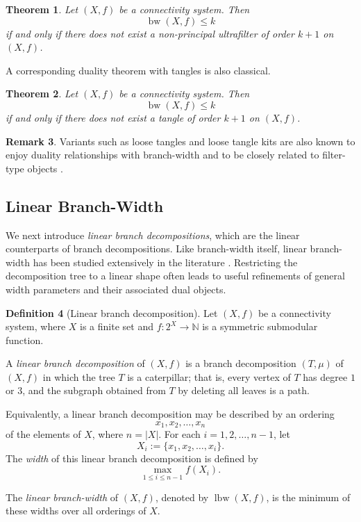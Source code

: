 \documentclass[10pt]{book}
\newtheorem{theorem}{Theorem}[section]
\theoremstyle{definition}
\newtheorem{remark}[theorem]{Remark}
\newtheorem{definition}[theorem]{Definition}
\begin{document}
\begin{theorem}\cite{16}
\label{thm:duality-ultrafilter}
Let \((X,f)\) be a connectivity system.
Then
\[
\operatorname{bw}(X,f)\leq k
\]
if and only if there does not exist a non-principal ultrafilter of order \(k+1\) on \((X,f)\).
\end{theorem}

A corresponding duality theorem with tangles is also classical.

\begin{theorem}\cite{9}
\label{thm:duality-tangle}
Let \((X,f)\) be a connectivity system.
Then
\[
\operatorname{bw}(X,f)\leq k
\]
if and only if there does not exist a tangle of order \(k+1\) on \((X,f)\).
\end{theorem}

\begin{remark}
Variants such as loose tangles and loose tangle kits are also known to enjoy
duality relationships with branch-width and to be closely related to filter-type objects
\cite{10,93}.
\end{remark}

\subsection{Linear Branch-Width}
We next introduce \emph{linear branch decompositions}, which are the linear counterparts of branch decompositions.  
Like branch-width itself, linear branch-width has been studied extensively in the literature \cite{39,51,52}.  
Restricting the decomposition tree to a linear shape often leads to useful refinements of general width parameters and their associated dual objects.

\begin{definition}[Linear branch decomposition]
\label{def:linear-decomposition}
Let \((X,f)\) be a connectivity system, where \(X\) is a finite set and
\(f:2^X\to \mathbb{N}\) is a symmetric submodular function.

A \emph{linear branch decomposition} of \((X,f)\) is a branch decomposition \((T,\mu)\) of \((X,f)\) in which the tree \(T\) is a caterpillar; that is, every vertex of \(T\) has degree \(1\) or \(3\), and the subgraph obtained from \(T\) by deleting all leaves is a path.

Equivalently, a linear branch decomposition may be described by an ordering
\[
x_1,x_2,\dots,x_n
\]
of the elements of \(X\), where \(n=|X|\).  
For each \(i=1,2,\dots,n-1\), let
\[
X_i:=\{x_1,x_2,\dots,x_i\}.
\]
The \emph{width} of this linear branch decomposition is defined by
\[
\max_{1\leq i\leq n-1} f(X_i).
\]

The \emph{linear branch-width} of \((X,f)\), denoted by
\(\operatorname{lbw}(X,f)\), is the minimum of these widths over all orderings of \(X\).
\end{definition}
\end{document}
